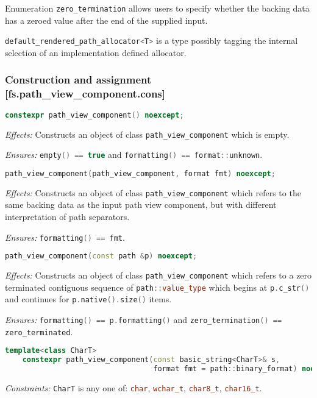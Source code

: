 \documentclass[11pt]{article}
\newcommand{\code}[2][cpp]{\lstinline[language=#1,basicstyle=\small\ttfamily]{#2}}
\newcommand{\desc}[1]{\textit{#1}}
\newcommand{\constraints}{\desc{Constraints: }}
\newcommand{\effects}{\desc{Effects: }}
\newcommand{\ensures}{\desc{Ensures: }}
\begin{document}
Enumeration \code{zero_termination} allows users to specify whether the backing data has a zeroed value after the end of the supplied input.

\code{default_rendered_path_allocator<T>} is a type possibly tagging the internal selection of an implementation defined allocator.

\subsubsection*{Construction and assignment [fs.path\_view\_component.cons]}

\begin{lstlisting}[language=cpp]
   constexpr path_view_component() noexcept;
\end{lstlisting}

\effects Constructs an object of class \code{path_view_component} which is empty.

\ensures \code{empty() == true} and \code{formatting() == format::unknown}.\\

\begin{lstlisting}[language=cpp]
    path_view_component(path_view_component, format fmt) noexcept;
\end{lstlisting}

\effects Constructs an object of class \code{path_view_component} which refers to the same backing data as the input path view component, but with different interpretation of path separators.

\ensures \code{formatting() == fmt}.\\

\begin{lstlisting}[language=cpp]
    path_view_component(const path &p) noexcept;
\end{lstlisting}

\effects Constructs an object of class \code{path_view_component} which refers to a zero terminated contiguous sequence of \code{path::value_type} which begins at \code{p.c_str()} and continues for \code{p.native().size()} items.

\ensures \code{formatting() == p.formatting()} and \code{zero_termination() == zero_terminated}.\\

\begin{lstlisting}[language=cpp]
    template<class CharT>
    constexpr path_view_component(const basic_string<CharT>& s,
                                  format fmt = path::binary_format) noexcept;
\end{lstlisting}
\constraints \code{CharT} is any one of: \code{char}, \code{wchar_t}, \code{char8_t}, \code{char16_t}.
\end{document}
